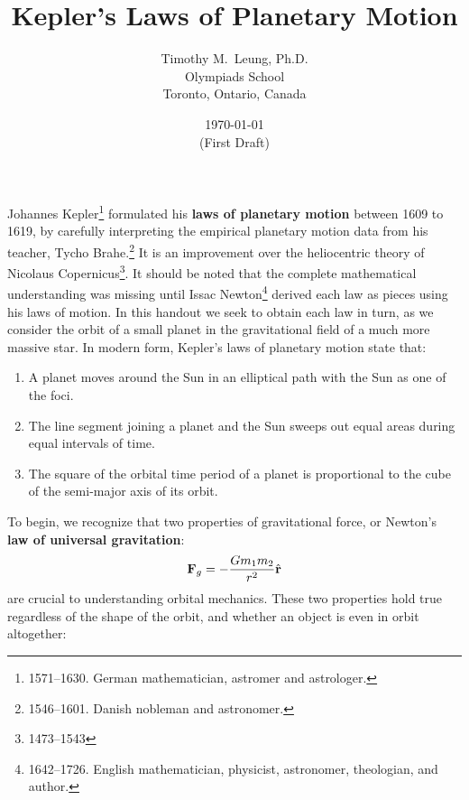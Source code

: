 \documentclass[11pt]{article}
\title{Kepler's Laws of Planetary Motion}
\author{Timothy M.\ Leung, Ph.D.\\
  Olympiads School\\ Toronto, Ontario, Canada}
\date{\today\\(First Draft)}
\newcommand{\mb}[1]{
  \ensuremath\mathbf{#1}
}
\begin{document}
\maketitle
Johannes Kepler\footnote{1571--1630. German mathematician, astromer and
  astrologer.} formulated his \textbf{laws of planetary motion}
between 1609 to 1619, by carefully interpreting the empirical planetary motion
data from his teacher, Tycho Brahe.\footnote{1546--1601. Danish nobleman and
  astronomer.} It is an improvement over the heliocentric
theory of Nicolaus Copernicus\footnote{1473--1543}. It should be noted that the
complete mathematical understanding was missing until Issac
Newton\footnote{1642--1726. English mathematician, physicist, astronomer,
  theologian, and author.} derived each law as pieces using his laws of motion.
In this handout we seek to obtain each law in turn, as we consider the orbit of
a small planet in the gravitational field of a much more massive star. In
modern form, Kepler's laws of planetary motion state that:
\begin{enumerate}[leftmargin=18pt,noitemsep,topsep=0pt]
\item A planet moves around the Sun in an elliptical path with the Sun as one
  of the foci.
\item The line segment joining a planet and the Sun sweeps out equal areas
  during equal intervals of time.
\item The square of the orbital time period of a planet is proportional to the
  cube of the semi-major axis of its orbit.
\end{enumerate}
To begin, we recognize that two properties of gravitational force, or Newton's
\textbf{law of universal gravitation}:
\begin{equation}
  \mb{F}_g=-\frac{Gm_1m_2}{r^2}\hat{\mb{r}}
\end{equation}
are crucial to
understanding orbital mechanics. These two properties hold true regardless
of the shape of the orbit, and whether an object is even in orbit altogether:
\end{document}
